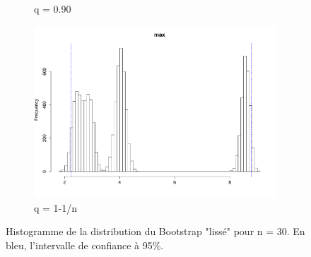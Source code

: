 \documentclass{article}
\renewcommand*{\(}{\left(}
\renewcommand*{\)}{\right)}
\begin{document}
\begin{figure}[H]
\begin{subfigure}[b]{0.3\textwidth}
        \caption{q = 0.90}
        \label{fig:smooth390}
    \end{subfigure}%
    \begin{subfigure}[b]{0.3\textwidth}
        \includegraphics[width = \linewidth]{img/BootstrapSmooth-Max-30.pdf}
        \caption{q = 1-1/n}
        \label{fig:smooth3BMax}
    \end{subfigure}%
    \caption{Histogramme de la distribution du Bootstrap "lissé" pour n = 30. En bleu, l'intervalle de confiance à 95\%.}
    \label{fig:smoothB30}
\end{figure}
\end{document}
